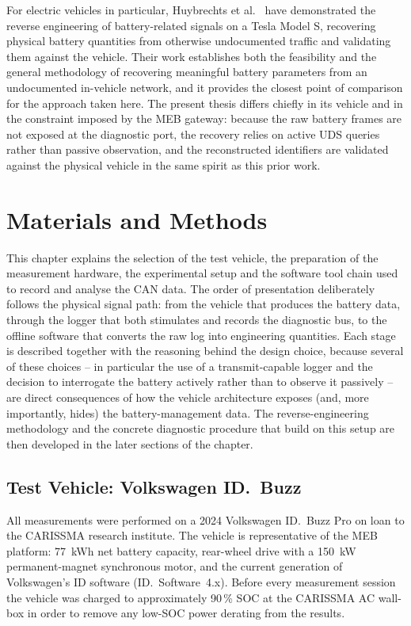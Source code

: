 \documentclass[11pt,a4paper,oneside,parskip=half]{scrreprt}
\begin{document}
For electric vehicles in particular, Huybrechts et al.~\cite{huybrechts2018reverse} have demonstrated the reverse engineering of battery-related signals on a Tesla Model S, recovering physical battery quantities from otherwise undocumented traffic and validating them against the vehicle. Their work establishes both the feasibility and the general methodology of recovering meaningful battery parameters from an undocumented in-vehicle network, and it provides the closest point of comparison for the approach taken here. The present thesis differs chiefly in its vehicle and in the constraint imposed by the MEB gateway: because the raw battery frames are not exposed at the diagnostic port, the recovery relies on active UDS queries rather than passive observation, and the reconstructed identifiers are validated against the physical vehicle in the same spirit as this prior work.


\chapter{Materials and Methods}
This chapter explains the selection of the test vehicle, the preparation of the measurement hardware, the experimental setup and the software tool chain used to record and analyse the CAN data. The order of presentation deliberately follows the physical signal path: from the vehicle that produces the battery data, through the logger that both stimulates and records the diagnostic bus, to the offline software that converts the raw log into engineering quantities. Each stage is described together with the reasoning behind the design choice, because several of these choices -- in particular the use of a transmit-capable logger and the decision to interrogate the battery actively rather than to observe it passively -- are direct consequences of how the vehicle architecture exposes (and, more importantly, hides) the battery-management data. The reverse-engineering methodology and the concrete diagnostic procedure that build on this setup are then developed in the later sections of the chapter.

\section{Test Vehicle: Volkswagen ID.~Buzz}
All measurements were performed on a 2024 Volkswagen ID.~Buzz Pro on loan to the CARISSMA research institute. The vehicle is representative of the MEB platform: 77~kWh net battery capacity, rear-wheel drive with a 150~kW permanent-magnet synchronous motor, and the current generation of Volkswagen's ID software (ID.~Software~4.x). Before every measurement session the vehicle was charged to approximately 90\,\% SOC at the CARISSMA AC wall-box in order to remove any low-SOC power derating from the results.
\end{document}
